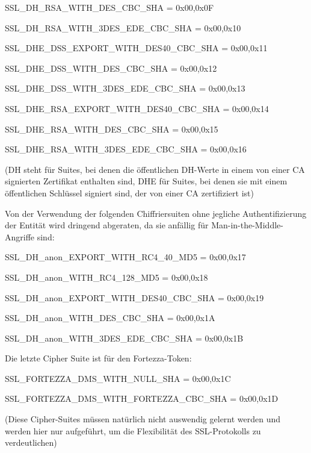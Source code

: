 \documentclass[a4paper]{article}
\begin{document}
\begin{multicols}{3}
\begin{itemize*}
\begin{itemize*}
                  \item SSL\_DH\_RSA\_WITH\_DES\_CBC\_SHA = { 0x00,0x0F }
                  \item SSL\_DH\_RSA\_WITH\_3DES\_EDE\_CBC\_SHA = { 0x00,0x10 }
                  \item SSL\_DHE\_DSS\_EXPORT\_WITH\_DES40\_CBC\_SHA = { 0x00,0x11 }
                  \item SSL\_DHE\_DSS\_WITH\_DES\_CBC\_SHA = { 0x00,0x12 }
                  \item SSL\_DHE\_DSS\_WITH\_3DES\_EDE\_CBC\_SHA = { 0x00,0x13 }
                  \item SSL\_DHE\_RSA\_EXPORT\_WITH\_DES40\_CBC\_SHA = { 0x00,0x14 }
                  \item SSL\_DHE\_RSA\_WITH\_DES\_CBC\_SHA = { 0x00,0x15 }
                  \item SSL\_DHE\_RSA\_WITH\_3DES\_EDE\_CBC\_SHA = { 0x00,0x16 }
            \end{itemize*}
      \end{itemize*}
      (DH steht für Suites, bei denen die öffentlichen DH-Werte in einem von einer CA signierten Zertifikat enthalten sind, DHE für Suites, bei denen sie mit einem öffentlichen Schlüssel signiert sind, der von einer CA zertifiziert ist)
      \begin{itemize*}
            \item Von der Verwendung der folgenden Chiffriersuiten ohne jegliche Authentifizierung der Entität wird dringend abgeraten, da sie anfällig für Man-in-the-Middle-Angriffe sind:
            \begin{itemize*}
                  \item SSL\_DH\_anon\_EXPORT\_WITH\_RC4\_40\_MD5 = { 0x00,0x17 }
                  \item SSL\_DH\_anon\_WITH\_RC4\_128\_MD5 = { 0x00,0x18 }
                  \item SSL\_DH\_anon\_EXPORT\_WITH\_DES40\_CBC\_SHA = { 0x00,0x19 }
                  \item SSL\_DH\_anon\_WITH\_DES\_CBC\_SHA = { 0x00,0x1A }
                  \item SSL\_DH\_anon\_WITH\_3DES\_EDE\_CBC\_SHA = { 0x00,0x1B }
            \end{itemize*}
            \item Die letzte Cipher Suite ist für den Fortezza-Token:
            \begin{itemize*}
                  \item SSL\_FORTEZZA\_DMS\_WITH\_NULL\_SHA = { 0x00,0x1C }
                  \item SSL\_FORTEZZA\_DMS\_WITH\_FORTEZZA\_CBC\_SHA = { 0x00,0x1D }
            \end{itemize*}
      \end{itemize*}
      (Diese Cipher-Suites müssen natürlich nicht auswendig gelernt werden und werden hier nur aufgeführt, um die Flexibilität des SSL-Protokolls zu verdeutlichen)


\end{multicols}
\end{document}
